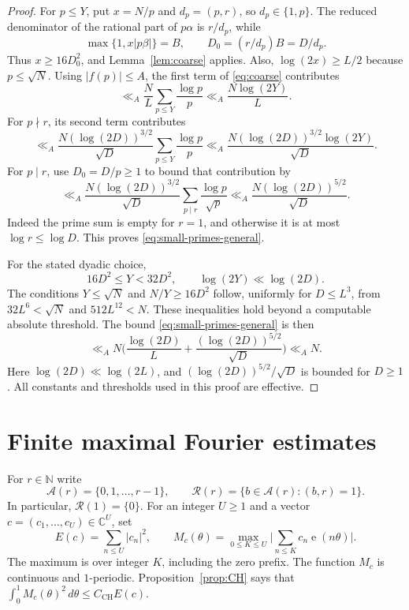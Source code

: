 \documentclass[11pt]{amsart}
\numberwithin{equation}{section}
\numberwithin{figure}{section}
\theoremstyle{definition}
\newcommand{\C}{\mathbb{C}}
\newcommand{\N}{\mathbb{N}}
\newcommand{\e}{\operatorname{e}}
\begin{document}
\begin{proof}
For $p\le Y$, put $x=N/p$ and $d_p=(p,r)$, so $d_p\in\{1,p\}$.
The reduced denominator of the rational part of $p\alpha$ is $r/d_p$,
while
\[
 \max\{1,x|p\beta|\}=B,\qquad D_0=(r/d_p)B=D/d_p.
\]
Thus $x\ge16D_0^2$, and Lemma~\ref{lem:coarse} applies. Also,
$\log(2x)\ge L/2$ because $p\le\sqrt N$.
Using $|f(p)|\le A$, the first term of \eqref{eq:coarse} contributes
\[
 \ll_A\frac NL\sum_{p\le Y}\frac{\log p}{p}
 \ll_A\frac{N\log(2Y)}L.
\]
For $p\nmid r$, its second term contributes
\[
 \ll_A\frac{N(\log(2D))^{3/2}}{\sqrt D}
                \sum_{p\le Y}\frac{\log p}{p}
 \ll_A\frac{N(\log(2D))^{3/2}\log(2Y)}{\sqrt D}.
\]
For $p\mid r$, use $D_0=D/p\ge1$ to bound that contribution by
\[
 \ll_A\frac{N(\log(2D))^{3/2}}{\sqrt D}
                \sum_{p\mid r}\frac{\log p}{\sqrt p}
 \ll_A\frac{N(\log(2D))^{5/2}}{\sqrt D}.
\]
Indeed the prime sum is empty for $r=1$, and otherwise it is at most
$\log r\le\log D$. This proves \eqref{eq:small-primes-general}.

For the stated dyadic choice,
\begin{equation}\label{eq:polynomial-cutoff}
 16D^2\le Y<32D^2,\qquad \log(2Y)\ll\log(2D).
\end{equation}
The conditions $Y\le\sqrt N$ and $N/Y\ge16D^2$ follow, uniformly for
$D\le L^3$, from $32L^6<\sqrt N$ and $512L^{12}<N$.
These inequalities hold beyond a computable absolute threshold.
The bound \eqref{eq:small-primes-general} is then
\[
 \ll_A N\Big(\frac{\log(2D)}L
 +\frac{(\log(2D))^{5/2}}{\sqrt D}\Big)\ll_A N.
\]
Here $\log(2D)\ll\log(2L)$, and
$(\log(2D))^{5/2}/\sqrt D$ is bounded for $D\ge1$.
All constants and thresholds used in this proof are effective.
\end{proof}

\section{Finite maximal Fourier estimates}\label{sec:fourier}

For $r\in\N$ write
\[
 \mathcal A(r)=\{0,1,\ldots,r-1\},\qquad
 \mathcal R(r)=\{b\in\mathcal A(r):(b,r)=1\}.
\]
In particular, $\mathcal R(1)=\{0\}$.
For an integer $U\ge1$ and a vector $c=(c_1,\ldots,c_U)\in\C^U$, set
\begin{equation}\label{eq:maximal-definition}
 E(c)=\sum_{n\le U}|c_n|^2,\qquad
 M_c(\theta)=\max_{0\le K\le U}
                  \bigg|\sum_{n\le K}c_n\e(n\theta)\bigg|.
\end{equation}
The maximum is over integer $K$, including the zero prefix.
The function $M_c$ is continuous and $1$-periodic.
Proposition~\ref{prop:CH} says that
$\int_0^1 M_c(\theta)^2\,d\theta\le C_\mathrm{CH}E(c)$.
\end{document}
